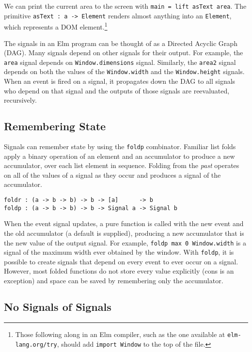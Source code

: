 \documentclass{article}
\begin{document}
We can print the current area to the screen with \texttt{main = lift asText
area}. The primitive \texttt{asText : a -> Element} renders almost anything into
an \texttt{Element}, which represents a DOM element.\footnote{Those following
    along in an Elm compiler, such as the one available at
    \texttt{elm-lang.org/try}, should add \texttt{import Window} to the top of
the file.}

The signals in an Elm program can be thought of as a Directed Acyclic
Graph (DAG). Many signals depend on other signals for their output. For
example, the \texttt{area} signal depends on \texttt{Window.dimensions}
signal. Similarly, the \texttt{area2} signal depends on both the values
of the \texttt{Window.width} and the \texttt{Window.height} signals.
When an event is fired on a signal, it propagates down the DAG to all
signals who depend on that signal and the outputs of those signals are
reevaluated, recursively.

\subsection{Remembering State}\label{remembering-state}

Signals can remember state by using the \texttt{foldp} combinator.
Familiar list folds apply a binary operation of an element and an
accumulator to produce a new accumulator, over each list element in
sequence. Folding from the \emph{past} operates on all of the values of
a signal as they occur and produces a signal of the accumulator.

\begin{verbatim}
foldr : (a -> b -> b) -> b -> [a]      -> b
foldp : (a -> b -> b) -> b -> Signal a -> Signal b
\end{verbatim}

When the event signal updates, a pure function is called with the new
event and the old accumulator (a default is supplied), producing a new
accumulator that is the new value of the output signal. For example,
\texttt{foldp max 0 Window.width} is a signal of the maximum width ever
obtained by the window. With \texttt{foldp}, it is possible to create
signals that depend on every event to ever occur on a signal. However,
most folded functions do not store every value explicitly (cons is an
exception) and space can be saved by remembering only the accumulator.

\subsection{No Signals of Signals}\label{no-signals-of-signals}
\end{document}
